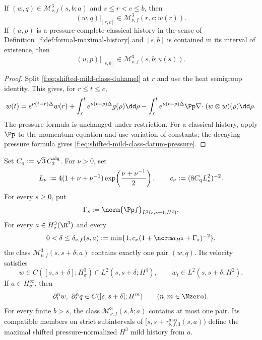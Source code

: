 \begin{lemma}
\label{f:lem:shifted-mild-restriction}
If \((w,q)\in\mathscr M_{\nu,f}^3(s,b;a)\) and
\(s\le r<c\le b\), then
\begin{equation}
 (w,q)|_{[r,c]}\in\mathscr M_{\nu,f}^3(r,c;w(r)).
 \label{f:eq:shifted-mild-restriction}
\end{equation}
If \((u,p)\) is a pressure-complete classical history in the sense of
Definition~\ref{f:def:formal-maximal-history} and
\([s,b]\) is contained in its interval of existence, then
\begin{equation}
 (u,p)|_{[s,b]}\in\mathscr M_{\nu,f}^3(s,b;u(s)).
 \label{f:eq:classical-mild-admission}
\end{equation}
\end{lemma}

\begin{proof}
Split \eqref{f:eq:shifted-mild-class-duhamel} at \(r\) and use the heat
semigroup identity.  This gives, for \(r\le t\le c\),
\[
 w(t)=e^{\nu(t-r)\Delta}w(r)
 +\int_r^t e^{\nu(t-\rho)\Delta}g(\rho)\dd\rho
 -\int_r^t e^{\nu(t-\rho)\Delta}
 \Pp\nabla\!\cdot(w\otimes w)(\rho)\dd\rho.
\]
The pressure formula is unchanged under restriction.  For a classical
history, apply \(\Pp\) to the momentum equation and use variation of
constants; the decaying pressure formula gives
\eqref{f:eq:shifted-mild-class-datum-pressure}.
\end{proof}

\begin{theorem}
\label{f:thm:local-restart}
Set \(C_{\rm q}:=\sqrt3\,C_3^{\rm alg}\).  For \(\nu>0\), set
\[
 L_\nu:=4(1+\nu+\nu^{-1})
 \exp\!\left(\frac{\nu+\nu^{-1}}2\right),
 \qquad
 c_\nu:=(8C_{\rm q}L_\nu^2)^{-2}.
\]
For every \(s\ge0\), put
\[
 \Gamma_s:=\norm{\Pp f}_{L^2(s,s+1;H^2)}.
\]
For every \(a\in H^3_\sigma(\R^3)\) and every
\[
 0<\delta\le\delta_{\nu,f}(s,a)
 :=\min\{1,c_\nu(1+\norm a_{H^3}+\Gamma_s)^{-2}\},
\]
the class \(\mathscr M_{\nu,f}^3(s,s+\delta;a)\) contains exactly one pair
\((w,q)\).  Its velocity satisfies
\[
 w\in C([s,s+\delta];H^3_\sigma)
 \cap L^2(s,s+\delta;H^4),
 \qquad
 w_t\in L^2(s,s+\delta;H^2).
\]
If \(a\in H^\infty_\sigma\), then
\[
 \partial_t^nw,\ \partial_t^nq
 \in C([s,s+\delta];H^m)
 \qquad(n,m\in\Nzero).
\]
For every finite \(b>s\), the class
\(\mathscr M_{\nu,f}^3(s,b;a)\) contains at most one pair.  Its compatible members
on strict subintervals of
\([s,s+\tau_{\nu,f,3}^{\max}(s,a))\) define the maximal shifted
pressure-normalized \(H^3\) mild history from \(a\).
\end{theorem}

